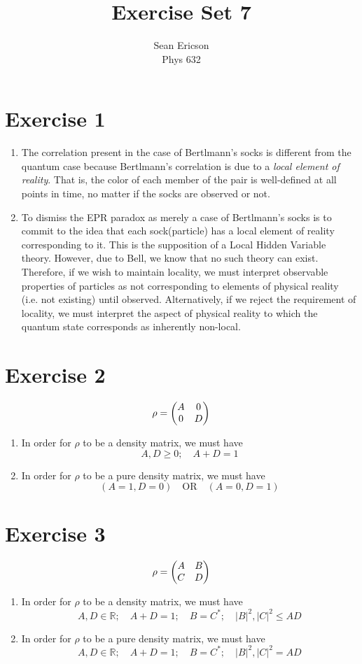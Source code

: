 \documentclass[12pt]{article}
\newcommand{\magsq}[1]{\big|#1\big|^2}
\begin{document}
	
\title{Exercise Set 7}
\author{Sean Ericson \\ Phys 632}
\maketitle

\section*{Exercise 1}
\begin{enumerate}[label=(\alph*)]
    \item The correlation present in the case of Bertlmann's socks is different from the quantum case because Bertlmann's correlation is due to a \textit{local element of reality}. That is, the color of each member of the pair is well-defined at all points in time, no matter if the socks are observed or not.
    \item To dismiss the EPR paradox as merely a case of Bertlmann's socks is to commit to the idea that each sock(particle) has a local element of reality corresponding to it. This is the supposition of a Local Hidden Variable theory. However, due to Bell, we know that no such theory can exist. Therefore, if we wish to maintain locality, we must interpret observable properties of particles as not corresponding to elements of physical reality (i.e. not existing) until observed. Alternatively, if we reject the requirement of locality, we must interpret the aspect of physical reality to which the quantum state corresponds as inherently non-local.
\end{enumerate}


\section*{Exercise 2}
\[ \rho = \mqty(A&0\\0&D) \]
\begin{enumerate}[label=(\alph*)]
    \item In order for $\rho$ to be a density matrix, we must have
    \[ A,D \geq 0; \quad A + D = 1 \]
    \item In order for $\rho$ to be a pure density matrix, we must have
    \[ (A=1, D=0) \quad\text{OR}\quad (A=0, D=1) \]
\end{enumerate}

\section*{Exercise 3}
\[ \rho = \mqty(A&B\\C&D) \]
\begin{enumerate}[label=(\alph*)]
    \item In order for $\rho$ to be a density matrix, we must have
    \[ A,D \in \mathbb{R}; \quad A+D=1; \quad B=C^*; \quad \magsq{B},\magsq{C} \leq AD \]
    \item In order for $\rho$ to be a pure density matrix, we must have
    \[ A,D \in \mathbb{R}; \quad A+D=1; \quad B=C^*; \quad \magsq{B},\magsq{C} = AD \]
\end{enumerate}
\end{document}
